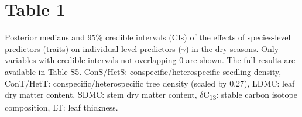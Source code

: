 \documentclass[
  12pt,
  letterpaper,
  DIV=11,
  numbers=noendperiod]{scrartcl}
\begin{document}
\newpage

\hypertarget{table-1}{%
\section{Table 1}\label{table-1}}

Posterior medians and 95\% credible intervals (CIs) of the effects of
species-level predictors (traits) on individual-level predictors
(\(\gamma\)) in the dry seasons. Only variables with credible intervals
not overlapping 0 are shown. The full results are available in Table S5.
ConS/HetS: conspecific/heterospecific seedling density, ConT/HetT:
conspecific/heterospecific tree density (scaled by 0.27), LDMC: leaf dry
matter content, SDMC: stem dry matter content,
\(\delta\)C\textsubscript{13}: stable carbon isotope composition, LT:
leaf thickness.
\end{document}
